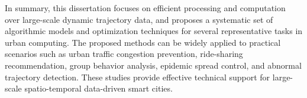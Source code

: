 In summary, this dissertation focuses on efficient processing and computation over large-scale dynamic trajectory data, and proposes a systematic set of algorithmic models and optimization techniques for several representative tasks in urban computing. The proposed methods can be widely applied to practical scenarios such as urban traffic congestion prevention, ride-sharing recommendation, group behavior analysis, epidemic spread control, and abnormal trajectory detection. These studies provide effective technical support for large-scale spatio-temporal data-driven smart cities.

